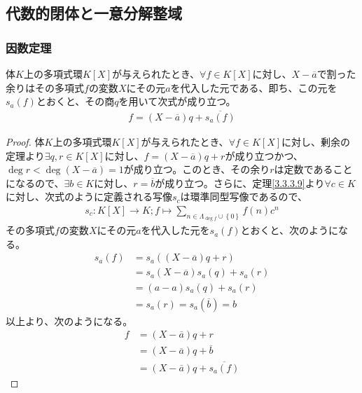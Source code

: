 \documentclass[dvipdfmx]{jsarticle}
\begin{document}
\subsection{代数的閉体と一意分解整域}%
\subsubsection{因数定理}%
\begin{thm}\label{3.3.5.1}
体$K$上の多項式環$K[ X]$が与えられたとき、$\forall f \in K[ X]$に対し、$X - \overline{a}$で割った余りはその多項式$f$の変数$X$にその元$a$を代入した元である、即ち、この元を$s_{a}(f)$とおくと、その商$q$を用いて次式が成り立つ。
\begin{align*}
f = \left( X - \overline{a} \right)q + \overline{s_{a}(f)}
\end{align*}
\end{thm}
\begin{proof}
体$K$上の多項式環$K[ X]$が与えられたとき、$\forall f \in K[ X]$に対し、剰余の定理より$\exists q,r \in K[ X]$に対し、$f = \left( X - \overline{a} \right)q + r$が成り立つかつ、$\deg r < \deg\left( X - \overline{a} \right) = 1$が成り立つ。このとき、その余り$r$は定数であることになるので、$\exists b \in K$に対し、$r = \overline{b}$が成り立つ。さらに、定理\ref{3.3.3.9}より$\forall c \in K$に対し、次式のように定義される写像$s_{c}$は環準同型写像であるので、
\begin{align*}
s_{c}:K[ X] \rightarrow K;f \mapsto \sum_{n \in \varLambda_{\deg f} \cup \left\{ 0 \right\}} {f(n)c^{n}}
\end{align*}
その多項式$f$の変数$X$にその元$a$を代入した元を$s_{a}(f)$とおくと、次のようになる。
\begin{align*}
s_{a}(f) &= s_{a}\left( \left( X - \overline{a} \right)q + r \right) \\
&= s_{a}\left( X - \overline{a} \right)s_{a}(q) + s_{a}(r) \\
&= (a - a)s_{a}(q) + s_{a}(r) \\
&= s_{a}(r) = s_{a}\left( \overline{b} \right) = b
\end{align*}
以上より、次のようになる。
\begin{align*}
f &= \left( X - \overline{a} \right)q + r \\
&= \left( X - \overline{a} \right)q + \overline{b} \\
&= \left( X - \overline{a} \right)q + \overline{s_{a}(f)}
\end{align*}
\end{proof}
\end{document}
